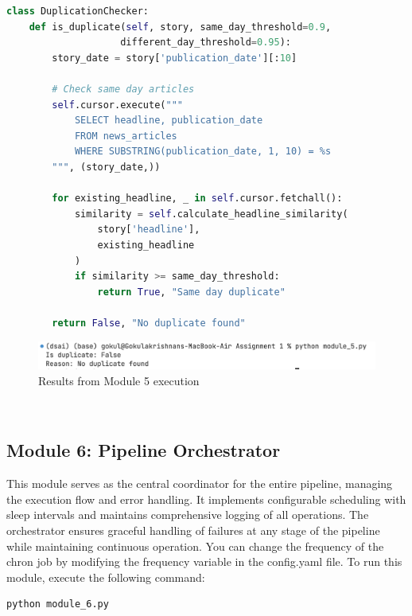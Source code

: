 \documentclass{article}
\begin{document}
\begin{lstlisting}[language=Python]
class DuplicationChecker:
    def is_duplicate(self, story, same_day_threshold=0.9, 
                    different_day_threshold=0.95):
        story_date = story['publication_date'][:10]
        
        # Check same day articles
        self.cursor.execute("""
            SELECT headline, publication_date 
            FROM news_articles
            WHERE SUBSTRING(publication_date, 1, 10) = %s
        """, (story_date,))
        
        for existing_headline, _ in self.cursor.fetchall():
            similarity = self.calculate_headline_similarity(
                story['headline'], 
                existing_headline
            )
            if similarity >= same_day_threshold:
                return True, "Same day duplicate"
        
        return False, "No duplicate found"
\end{lstlisting}

\begin{figure}[H]
    \centering
    \includegraphics[width=\textwidth]{report/module_5.png}
    \caption{Results from Module 5 execution}
    \label{fig:module5-results}
\end{figure}

\\

\subsection{Module 6: Pipeline Orchestrator}
This module serves as the central coordinator for the entire pipeline, managing the execution flow and error handling. It implements configurable scheduling with sleep intervals and maintains comprehensive logging of all operations. The orchestrator ensures graceful handling of failures at any stage of the pipeline while maintaining continuous operation. You can change the frequency of the chron job by modifying the frequency variable in the config.yaml file.
To run this module, execute the following command:
\begin{lstlisting}[language=bash]
python module_6.py 
\end{lstlisting}
\end{document}
